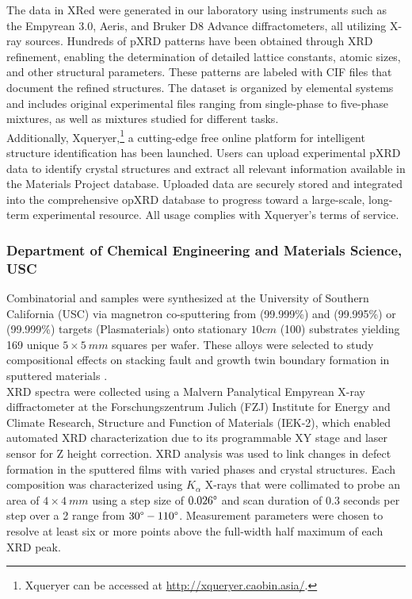 The data in XRed were generated in our laboratory using instruments such as the Empyrean 3.0, Aeris, and Bruker D8 Advance diffractometers, all utilizing  X-ray sources. Hundreds of pXRD patterns have been obtained through XRD refinement, enabling the determination of detailed lattice constants, atomic sizes, and other structural parameters. These patterns are labeled with CIF files that document the refined structures. The dataset is organized by elemental systems and includes original experimental files ranging from single-phase to five-phase mixtures, as well as mixtures studied for different tasks. \\

Additionally, Xqueryer,\footnote{Xqueryer can be accessed at \url{http://xqueryer.caobin.asia/}.} a cutting-edge free online platform for intelligent structure identification has been launched. Users can upload experimental pXRD data to identify crystal structures and extract all relevant information available in the Materials Project database. Uploaded data are securely stored and integrated into the comprehensive opXRD database to progress toward a large-scale, long-term experimental resource. All usage complies with Xqueryer's terms of service.


\subsubsection*{Department of Chemical Engineering and Materials Science, USC}

Combinatorial  and  samples were synthesized at the University of Southern California (USC) via magnetron co-sputtering from  (99.999\%) and  (99.995\%) or  (99.999\%) targets (Plasmaterials) onto stationary $10 \si{cm}$  (100) substrates yielding 169 unique $5 \times 5 \ \si{mm}$ squares per wafer. These alloys were selected to study compositional effects on stacking fault and growth twin boundary formation in sputtered materials \cite{2024AcMat.27019839A,alwen2024combinatorial}. \\

XRD spectra were collected using a Malvern Panalytical Empyrean X-ray diffractometer at the Forschungszentrum Julich (FZJ) Institute for Energy and Climate Research, Structure and Function of Materials (IEK-2), which enabled automated XRD characterization due to its programmable XY stage and laser sensor for Z height correction. XRD analysis was used to link changes in defect formation in the sputtered films with varied phases and crystal structures. Each composition was characterized using  $K_\alpha$ X-rays that were collimated to probe an area of $4 \times 4 \ \si{mm}$ using a step size of $0.026\degree$ and scan duration of $0.3$ seconds per step over a 2 range from $30\degree - 110\degree$. Measurement parameters were chosen to resolve at least six or more points above the full-width half maximum of each XRD peak.

